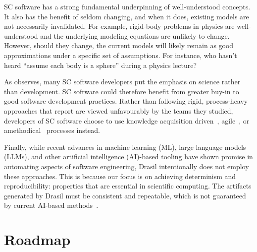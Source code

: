 SC software has a strong fundamental underpinning of well-understood concepts.
It also has the benefit of seldom changing, and when it does, existing models
are not necessarily invalidated. For example, rigid-body problems in physics are
well-understood and the underlying modeling equations are unlikely to change.
However, should they change, the current models will likely remain as good
approximations under a specific set of assumptions. For instance, who hasn't
heard ``assume each body is a sphere'' during a physics lecture?

As \citet{Kelly2007} observes, many SC software developers put the emphasis on
science rather than development. SC software could therefore benefit from
greater buy-in to good software development practices. Rather than following
rigid, process-heavy approaches that \citet{CarverEtAl2007} report are viewed
unfavourably by the teams they studied, developers of SC software choose to use
knowledge acquisition driven~\citep{Kelly2015},
agile~\citep{Segal2005, CarverEtAl2007, AckroydEtAl2008, 
EasterbrookAndJohns2009}, or amethodical~\citep{Kelly2013} processes instead.

Finally, while recent advances in machine learning (ML), large language models
(LLMs), and other artificial intelligence (AI)-based tooling have shown promise
in automating aspects of software engineering, Drasil intentionally does not
employ these approaches. This is because our focus is on achieving determinism 
and reproducibility: properties that are essential in scientific computing. The 
artifacts generated by Drasil must be consistent and repeatable, which is not 
guaranteed by current AI-based methods~\citep{OuyangEtAl2025,
BalachandranEtAl2024}.

\section{Roadmap}

